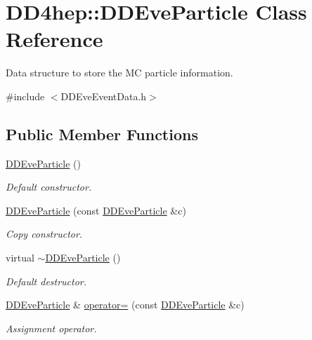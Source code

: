 \hypertarget{class_d_d4hep_1_1_d_d_eve_particle}{}\section{D\+D4hep\+:\+:D\+D\+Eve\+Particle Class Reference}
\label{class_d_d4hep_1_1_d_d_eve_particle}


Data structure to store the MC particle information.  




{\ttfamily \#include $<$D\+D\+Eve\+Event\+Data.\+h$>$}

\subsection*{Public Member Functions}
\begin{DoxyCompactItemize}
\item 
\hyperlink{class_d_d4hep_1_1_d_d_eve_particle_a8ef98497c0ce8ee341913e031ffaf265}{D\+D\+Eve\+Particle} ()
\begin{DoxyCompactList}\small\item\em Default constructor. \end{DoxyCompactList}\item 
\hyperlink{class_d_d4hep_1_1_d_d_eve_particle_a3c869edc6c878c86cc596f7f435c87f4}{D\+D\+Eve\+Particle} (const \hyperlink{class_d_d4hep_1_1_d_d_eve_particle}{D\+D\+Eve\+Particle} \&c)
\begin{DoxyCompactList}\small\item\em Copy constructor. \end{DoxyCompactList}\item 
virtual \hyperlink{class_d_d4hep_1_1_d_d_eve_particle_ac09bab207cb97dc1348aceb043319123}{$\sim$\+D\+D\+Eve\+Particle} ()
\begin{DoxyCompactList}\small\item\em Default destructor. \end{DoxyCompactList}\item 
\hyperlink{class_d_d4hep_1_1_d_d_eve_particle}{D\+D\+Eve\+Particle} \& \hyperlink{class_d_d4hep_1_1_d_d_eve_particle_aa435c5ef002b03be3f38e5fd5c313b62}{operator=} (const \hyperlink{class_d_d4hep_1_1_d_d_eve_particle}{D\+D\+Eve\+Particle} \&c)
\begin{DoxyCompactList}\small\item\em Assignment operator. \end{DoxyCompactList}\end{DoxyCompactItemize}
